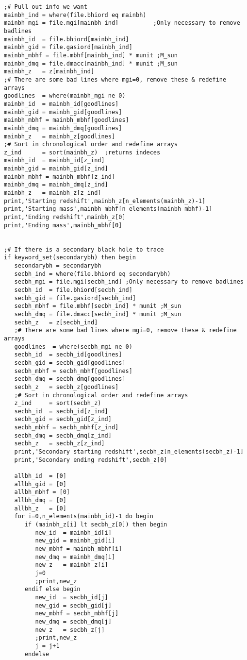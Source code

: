 \documentclass[12pt,headA,chapB]{fiskthesis}
\begin{document}
\begin{verbatim}
;# Pull out info we want
mainbh_ind = where(file.bhiord eq mainbh)
mainbh_mgi = file.mgi[mainbh_ind]          ;Only necessary to remove badlines
mainbh_id  = file.bhiord[mainbh_ind]
mainbh_gid = file.gasiord[mainbh_ind]
mainbh_mbhf = file.mbhf[mainbh_ind] * munit ;M_sun
mainbh_dmq = file.dmacc[mainbh_ind] * munit ;M_sun
mainbh_z   = z[mainbh_ind]
;# There are some bad lines where mgi=0, remove these & redefine arrays
goodlines  = where(mainbh_mgi ne 0)
mainbh_id  = mainbh_id[goodlines]
mainbh_gid = mainbh_gid[goodlines]
mainbh_mbhf = mainbh_mbhf[goodlines]
mainbh_dmq = mainbh_dmq[goodlines]
mainbh_z   = mainbh_z[goodlines]
;# Sort in chronological order and redefine arrays
z_ind      = sort(mainbh_z)  ;returns indeces
mainbh_id  = mainbh_id[z_ind]
mainbh_gid = mainbh_gid[z_ind]
mainbh_mbhf = mainbh_mbhf[z_ind] 
mainbh_dmq = mainbh_dmq[z_ind]
mainbh_z   = mainbh_z[z_ind]
print,'Starting redshift',mainbh_z[n_elements(mainbh_z)-1]
print,'Starting mass',mainbh_mbhf[n_elements(mainbh_mbhf)-1]
print,'Ending redshift',mainbh_z[0]
print,'Ending mass',mainbh_mbhf[0]


;# If there is a secondary black hole to trace
if keyword_set(secondarybh) then begin
   secondarybh = secondarybh
   secbh_ind = where(file.bhiord eq secondarybh)
   secbh_mgi = file.mgi[secbh_ind] ;Only necessary to remove badlines
   secbh_id  = file.bhiord[secbh_ind]
   secbh_gid = file.gasiord[secbh_ind]
   secbh_mbhf = file.mbhf[secbh_ind] * munit ;M_sun
   secbh_dmq = file.dmacc[secbh_ind] * munit ;M_sun
   secbh_z   = z[secbh_ind]
   ;# There are some bad lines where mgi=0, remove these & redefine arrays
   goodlines  = where(secbh_mgi ne 0)
   secbh_id  = secbh_id[goodlines]
   secbh_gid = secbh_gid[goodlines]
   secbh_mbhf = secbh_mbhf[goodlines]
   secbh_dmq = secbh_dmq[goodlines]
   secbh_z   = secbh_z[goodlines]
   ;# Sort in chronological order and redefine arrays
   z_ind     = sort(secbh_z)
   secbh_id  = secbh_id[z_ind]
   secbh_gid = secbh_gid[z_ind]
   secbh_mbhf = secbh_mbhf[z_ind]
   secbh_dmq = secbh_dmq[z_ind]
   secbh_z   = secbh_z[z_ind]
   print,'Secondary starting redshift',secbh_z[n_elements(secbh_z)-1]
   print,'Secondary ending redshift',secbh_z[0]
   
   allbh_id  = [0]
   allbh_gid = [0]
   allbh_mbhf = [0]
   allbh_dmq = [0]
   allbh_z   = [0]
   for i=0,n_elements(mainbh_id)-1 do begin
      if (mainbh_z[i] lt secbh_z[0]) then begin
         new_id  = mainbh_id[i]
         new_gid = mainbh_gid[i]
         new_mbhf = mainbh_mbhf[i]
         new_dmq = mainbh_dmq[i]
         new_z   = mainbh_z[i]
         j=0
         ;print,new_z
      endif else begin
         new_id  = secbh_id[j]
         new_gid = secbh_gid[j]
         new_mbhf = secbh_mbhf[j]
         new_dmq = secbh_dmq[j]
         new_z   = secbh_z[j]
         ;print,new_z
         j = j+1
      endelse
      

\end{verbatim}
\end{document}
